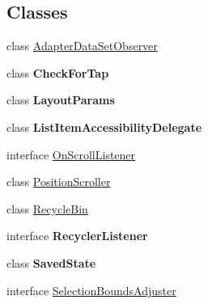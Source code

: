 \subsection*{Classes}
\begin{DoxyCompactItemize}
\item 
class \hyperlink{classit_1_1sephiroth_1_1android_1_1library_1_1widget_1_1_abs_h_list_view_1_1_adapter_data_set_observer}{Adapter\+Data\+Set\+Observer}
\item 
class {\bfseries Check\+For\+Tap}
\item 
class {\bfseries Layout\+Params}
\item 
class {\bfseries List\+Item\+Accessibility\+Delegate}
\item 
interface \hyperlink{interfaceit_1_1sephiroth_1_1android_1_1library_1_1widget_1_1_abs_h_list_view_1_1_on_scroll_listener}{On\+Scroll\+Listener}
\item 
class \hyperlink{classit_1_1sephiroth_1_1android_1_1library_1_1widget_1_1_abs_h_list_view_1_1_position_scroller}{Position\+Scroller}
\item 
class \hyperlink{classit_1_1sephiroth_1_1android_1_1library_1_1widget_1_1_abs_h_list_view_1_1_recycle_bin}{Recycle\+Bin}
\item 
interface {\bfseries Recycler\+Listener}
\item 
class {\bfseries Saved\+State}
\item 
interface \hyperlink{interfaceit_1_1sephiroth_1_1android_1_1library_1_1widget_1_1_abs_h_list_view_1_1_selection_bounds_adjuster}{Selection\+Bounds\+Adjuster}
\end{DoxyCompactItemize}
